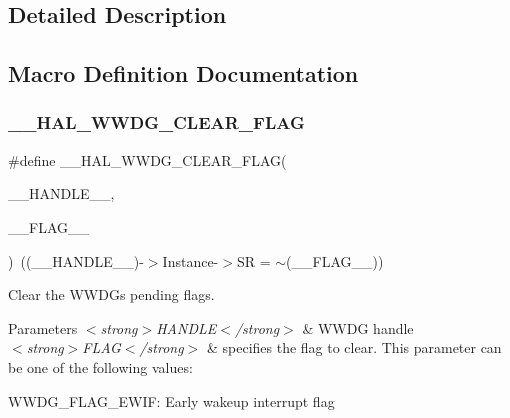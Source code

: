 \subsection{Detailed Description}


\subsection{Macro Definition Documentation}
\mbox{\label{group___w_w_d_g___exported___macros_gae9c3b916e244deffc6a673d97df63671}} 
\subsubsection{\texorpdfstring{\+\_\+\+\_\+\+H\+A\+L\+\_\+\+W\+W\+D\+G\+\_\+\+C\+L\+E\+A\+R\+\_\+\+F\+L\+AG}{\_\_HAL\_WWDG\_CLEAR\_FLAG}}
{\footnotesize\ttfamily \#define \+\_\+\+\_\+\+H\+A\+L\+\_\+\+W\+W\+D\+G\+\_\+\+C\+L\+E\+A\+R\+\_\+\+F\+L\+AG(\begin{DoxyParamCaption}\item[{}]{\+\_\+\+\_\+\+H\+A\+N\+D\+L\+E\+\_\+\+\_\+,  }\item[{}]{\+\_\+\+\_\+\+F\+L\+A\+G\+\_\+\+\_\+ }\end{DoxyParamCaption})~((\+\_\+\+\_\+\+H\+A\+N\+D\+L\+E\+\_\+\+\_\+)-\/$>$Instance-\/$>$SR = $\sim$(\+\_\+\+\_\+\+F\+L\+A\+G\+\_\+\+\_\+))}



Clear the W\+W\+DG\textquotesingle{}s pending flags. 


\begin{DoxyParams}{Parameters}
{\em $<$strong$>$\+H\+A\+N\+D\+L\+E$<$/strong$>$} & W\+W\+DG handle \\
\hline
{\em $<$strong$>$\+F\+L\+A\+G$<$/strong$>$} & specifies the flag to clear. This parameter can be one of the following values\+: \begin{DoxyItemize}
\item W\+W\+D\+G\+\_\+\+F\+L\+A\+G\+\_\+\+E\+W\+IF\+: Early wakeup interrupt flag \end{DoxyItemize}
\\
\hline
\end{DoxyParams}

